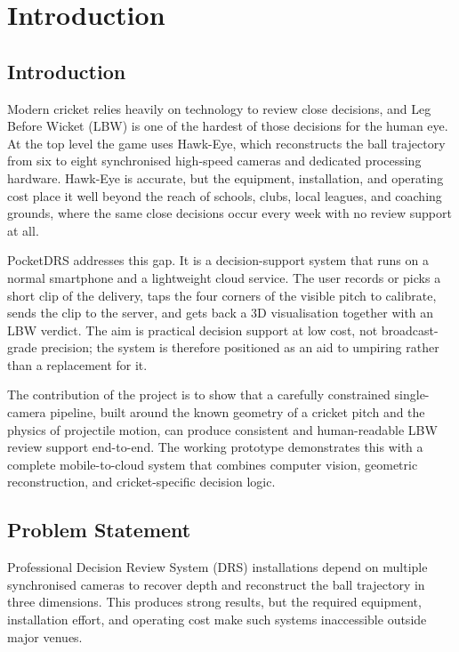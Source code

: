 \documentclass[12pt,a4paper]{report}
\begin{document}
\clearpage
{}

\chapter{Introduction}

\section{Introduction}

Modern cricket relies heavily on technology to review close decisions, and Leg Before Wicket (LBW) is one of the hardest of those decisions for the human eye. At the top level the game uses Hawk-Eye, which reconstructs the ball trajectory from six to eight synchronised high-speed cameras and dedicated processing hardware. Hawk-Eye is accurate, but the equipment, installation, and operating cost place it well beyond the reach of schools, clubs, local leagues, and coaching grounds, where the same close decisions occur every week with no review support at all.

PocketDRS addresses this gap. It is a decision-support system that runs on a normal smartphone and a lightweight cloud service. The user records or picks a short clip of the delivery, taps the four corners of the visible pitch to calibrate, sends the clip to the server, and gets back a 3D visualisation together with an LBW verdict. The aim is practical decision support at low cost, not broadcast-grade precision; the system is therefore positioned as an aid to umpiring rather than a replacement for it.

The contribution of the project is to show that a carefully constrained single-camera pipeline, built around the known geometry of a cricket pitch and the physics of projectile motion, can produce consistent and human-readable LBW review support end-to-end. The working prototype demonstrates this with a complete mobile-to-cloud system that combines computer vision, geometric reconstruction, and cricket-specific decision logic.

\section{Problem Statement}

Professional Decision Review System (DRS) installations depend on multiple synchronised cameras to recover depth and reconstruct the ball trajectory in three dimensions. This produces strong results, but the required equipment, installation effort, and operating cost make such systems inaccessible outside major venues.
\end{document}
